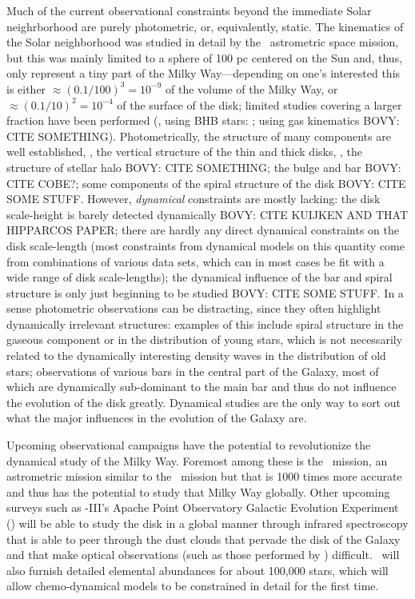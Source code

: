 Much of the current observational constraints beyond the immediate
Solar neighrborhood are purely photometric, or, equivalently,
static. The kinematics of the Solar neighborhood was studied in detail
by the \Hipparcos\ astrometric space mission, but this was mainly
limited to a sphere of 100 pc centered on the Sun and, thus, only
represent a tiny part of the Milky Way---depending on one's interested
this is either $\approx (0.1/100)^3 = 10^{-9}$ of the volume of the
Milky Way, or $\approx (0.1/10)^2 = 10^{-4}$ of the surface of the
disk; limited studies covering a larger fraction have been performed
(\eg, using BHB stars: \citealt{Xue08a}; using gas kinematics BOVY:
CITE SOMETHING). Photometrically, the structure of many components are
well established, \eg, the vertical structure of the thin and thick
disks, \citep{Juric05a}, the structure of stellar halo BOVY: CITE
SOMETHING; the bulge and bar BOVY: CITE COBE?; some components of the
spiral structure of the disk BOVY: CITE SOME
STUFF. However, \emph{dynamical} constraints are mostly lacking: the
disk scale-height is barely detected dynamically BOVY: CITE KUIJKEN
AND THAT HIPPARCOS PAPER; there are hardly any direct dynamical
constraints on the disk scale-length (most constraints from dynamical
models on this quantity come from combinations of various data sets,
which can in most cases be fit with a wide range of disk
scale-lengths); the dynamical influence of the bar and spiral
structure is only just beginning to be studied BOVY: CITE SOME
STUFF. In a sense photometric observations can be distracting, since
they often highlight dynamically irrelevant structures: examples of
this include spiral structure in the gaseous component or in the
distribution of young stars, which is not necessarily related to the
dynamically interesting density waves in the distribution of old
stars; observations of various bars in the central part of the Galaxy,
most of which are dynamically sub-dominant to the main bar and thus do
not influence the evolution of the disk greatly. Dynamical studies are
the only way to sort out what the major influences in the evolution of
the Galaxy are.

Upcoming observational campaigns have the potential to revolutionize
the dynamical study of the Milky Way. Foremost among these is
the \Gaia\ mission, an astrometric mission similar to the \Hipparcos\
mission but that is 1000 times more accurate and thus has the
potential to study that Milky Way globally. Other upcoming surveys
such as \sdss-III's Apache Point Observatory Galactic Evolution
Experiment (\apogee) will be able to study the disk in a global manner
through infrared spectroscopy that is able to peer through the dust
clouds that pervade the disk of the Galaxy and that make optical
observations (such as those performed by \Gaia) difficult. \apogee\
will also furnish detailed elemental abundances for about 100,000
stars, which will allow chemo-dynamical models to be constrained in
detail for the first time.

